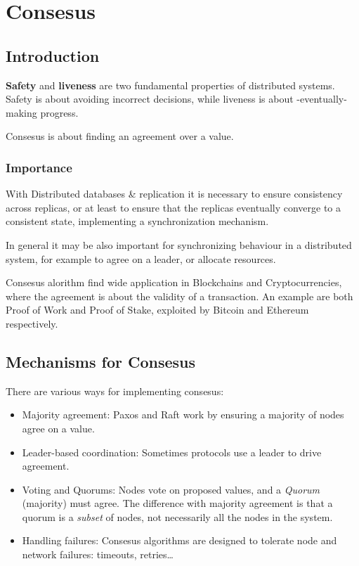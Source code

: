 \chapter{Consesus}

\section{Introduction}
\textbf{Safety} and \textbf{liveness} are two fundamental properties of distributed systems.
Safety is about avoiding incorrect decisions, while liveness is about -eventually- making progress.

Consesus is about finding an agreement over a value.

\subsection{Importance}
With Distributed databases \& replication it is necessary to ensure consistency across replicas, or at least to ensure that the replicas eventually converge to a consistent state, implementing a synchronization mechanism.


In general it may be also important for synchronizing behaviour in a distributed system, for example to agree on a leader, or allocate resources.
\nl

Consesus alorithm find wide application in Blockchains and Cryptocurrencies, where the agreement is about the validity of a transaction. An example are both Proof of Work and Proof of Stake, exploited by Bitcoin and Ethereum respectively.


\section{Mechanisms for Consesus}
There are various ways for implementing consesus:
\begin{itemize}
   \item Majority agreement:
   Paxos and Raft work by ensuring a majority of nodes agree on a value.
   \item Leader-based coordination:
   Sometimes protocols use a leader to drive agreement.
   \item Voting and Quorums:
   Nodes vote on proposed values, and a \textit{Quorum} (majority) must agree.
   The difference with majority agreement is that a quorum is a \textit{subset} of nodes, not necessarily all the nodes in the system. 
   \item Handling failures:
   Consesus algorithms are designed to tolerate node and network failures: timeouts, retries\dots
\end{itemize}

